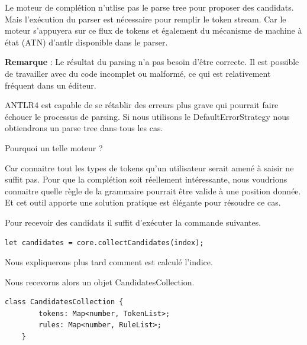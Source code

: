 \documentclass[
    iict, %
    il, %
]{heig-tb}
\begin{document}


Le moteur de complétion n'utlise pas le parse tree pour proposer des candidats. Mais l'exécution du parser est nécessaire pour remplir le token stream.
Car le moteur s'appuyera sur ce flux de tokens et également du mécanisme de machine à état (ATN) d'antlr disponible dans le parser.

\textbf{Remarque} : Le résultat du parsing n'a pas besoin d'être correcte. Il est possible de travailler avec du code incomplet ou malformé, ce qui est relativement fréquent dans un éditeur.

ANTLR4 est capable de se rétablir des erreurs plus grave qui pourrait faire échouer le processus de parsing.
Si nous utilisons le DefaultErrorStrategy nous obtiendrons un parse tree dans tous les cas.

Pourquoi un telle moteur ?

Car connaitre tout les types de tokens qu'un utilisateur serait amené à saisir ne suffit pas. Pour que la complétion soit réellement intéressante, nous voudrions connaitre quelle règle de la grammaire pourrait être valide à une position donnée.
Et cet outil apporte une solution pratique est élégante pour résoudre ce cas. %


Pour recevoir des candidats il suffit d'exécuter la commande suivantes.

\begin{lstlisting}[frame=single]
    let candidates = core.collectCandidates(index);
\end{lstlisting}


Nous expliquerons plus tard comment est calculé l'indice.

Nous recevorns alors un objet CandidatesCollection.

\begin{lstlisting}[frame=single]
    class CandidatesCollection {
        tokens: Map<number, TokenList>;
        rules: Map<number, RuleList>;
    }
\end{lstlisting}
\end{document}
